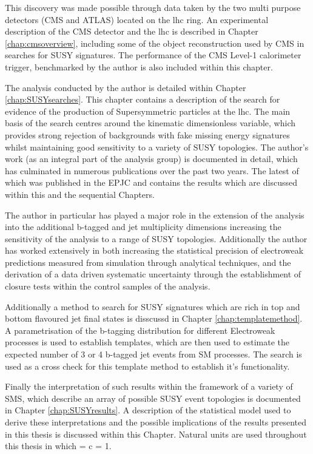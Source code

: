 This discovery was made possible through data taken by the two multi purpose detectors (\ac{CMS} and \ac{ATLAS}) located on the \ac{lhc} ring. An experimental description of the \ac{CMS} detector and the \ac{lhc} is described in Chapter \ref{chap:cmsoverview}, including some of the object reconstruction used by \ac{CMS} in searches for \ac{SUSY} signatures. The performance of the \ac{CMS} Level-1 calorimeter trigger, benchmarked by the author is also included within this chapter.

The analysis conducted by the author is detailed within Chapter \ref{chap:SUSYsearches}. This chapter contains a description of the search for evidence of the production of Supersymmetric particles at the \ac{lhc}. The main basis of the search centres around the kinematic dimensionless \alphat variable, which provides strong rejection of backgrounds with fake missing energy signatures whilst maintaining good sensitivity to a variety of \ac{SUSY} topologies. The author's work (as an integral part of the analysis group) is documented in detail, which has culminated in numerous publications over the past two years. The latest of which was published in the \acf{EPJC} \cite{ra1_epjc} and contains the results which are discussed within this and the sequential Chapters. 

The author in particular has played a major role in the extension of the \alphat analysis into the additional b-tagged and jet multiplicity dimensions increasing the sensitivity of the analysis to a range of \ac{SUSY} topologies. Additionally the author has worked extensively in both increasing the statistical precision of electroweak predictions measured from simulation through analytical techniques, and the derivation of a data driven systematic uncertainty through the establishment of closure tests within the control samples of the analysis. 

Additionally a method to search for \ac{SUSY} signatures which are rich in top and bottom flavoured jet final states is disscussd in Chapter \ref{chap:templatemethod}. A parametrisation of the b-tagging distribution for different Electroweak processes is used to establish templates, which are then used to estimate the expected number of 3 or 4 b-tagged jet events from \ac{SM} processes. The \alphat search is used as a cross check for this template method to establish it's functionality. 

Finally the interpretation of such results within the framework of a variety of \acf{SMS}, which describe an array of possible \ac{SUSY} event topologies is documented in Chapter \ref{chap:SUSYresults}. A description of the statistical model used to derive these interpretations and the possible implications of the results presented in this thesis is discussed within this Chapter. Natural units are used throughout this thesis in which \hbarred = c = 1.
